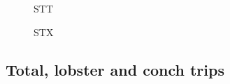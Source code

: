 \documentclass[
  letterpaper,
  oneside,
  open=any]{scrbook}
\begin{document}
\begin{figure}


\caption{\label{fig-perlandSTT}STT}

\end{figure}%

\begin{figure}


\caption{\label{fig-perlandSTX}STX}

\end{figure}%

\subsection{Total, lobster and conch
trips}\label{total-lobster-and-conch-trips}
\end{document}
